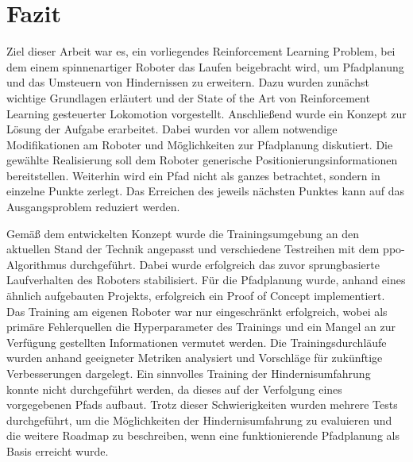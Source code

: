 \chapter{Fazit}
Ziel dieser Arbeit war es, ein vorliegendes Reinforcement Learning Problem, bei dem einem spinnenartiger Roboter das Laufen beigebracht wird, um Pfadplanung und das Umsteuern von Hindernissen zu erweitern.
Dazu wurden zunächst wichtige Grundlagen erläutert und der State of the Art von Reinforcement Learning gesteuerter Lokomotion vorgestellt.
Anschließend wurde ein Konzept zur Lösung der Aufgabe erarbeitet.
Dabei wurden vor allem notwendige Modifikationen am Roboter und Möglichkeiten zur Pfadplanung diskutiert.
Die gewählte Realisierung soll dem Roboter generische Positionierungsinformationen bereitstellen.
Weiterhin wird ein Pfad nicht als ganzes betrachtet, sondern in einzelne Punkte zerlegt.
Das Erreichen des jeweils nächsten Punktes kann auf das Ausgangsproblem reduziert werden.

Gemäß dem entwickelten Konzept wurde die Trainingsumgebung an den aktuellen Stand der Technik angepasst und verschiedene Testreihen mit dem \acl{ppo}-Algorithmus durchgeführt.
Dabei wurde erfolgreich das zuvor sprungbasierte Laufverhalten des Roboters stabilisiert.
Für die Pfadplanung wurde, anhand eines ähnlich aufgebauten Projekts, erfolgreich ein Proof of Concept implementiert.
Das Training am eigenen Roboter war nur eingeschränkt erfolgreich, wobei als primäre Fehlerquellen die Hyperparameter des Trainings und ein Mangel an zur Verfügung gestellten Informationen vermutet werden.
Die Trainingsdurchläufe wurden anhand geeigneter Metriken analysiert und Vorschläge für zukünftige Verbesserungen dargelegt.
Ein sinnvolles Training der Hindernisumfahrung konnte nicht durchgeführt werden, da dieses auf der Verfolgung eines vorgegebenen Pfads aufbaut.
Trotz dieser Schwierigkeiten wurden mehrere Tests durchgeführt, um die Möglichkeiten der Hindernisumfahrung zu evaluieren und die weitere Roadmap zu beschreiben, wenn eine funktionierende Pfadplanung als Basis erreicht wurde.
